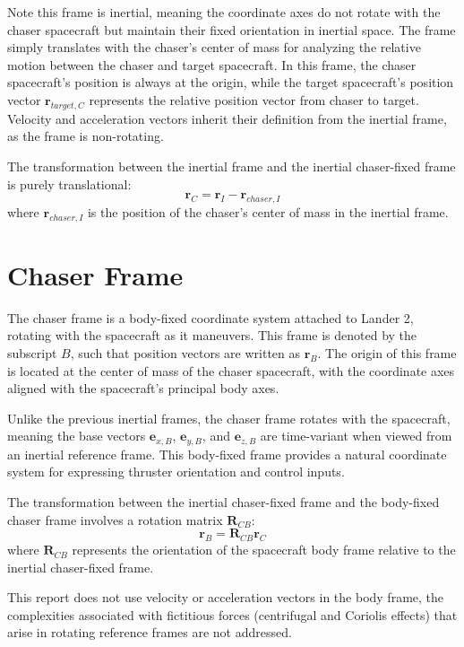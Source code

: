 Note this frame is inertial, meaning the coordinate axes do not rotate with the chaser spacecraft but maintain their fixed orientation in inertial space. The frame simply translates with the chaser's center of mass for analyzing the relative motion between the chaser and target spacecraft. In this frame, the chaser spacecraft's position is always at the origin, while the target spacecraft's position vector $\mathbf{r}_{target,C}$ represents the relative position vector from chaser to target. Velocity and acceleration vectors inherit their definition from the inertial frame, as the frame is non-rotating.

The transformation between the inertial frame and the inertial chaser-fixed frame is purely translational:
\begin{equation}
    \mathbf{r}_C = \mathbf{r}_I - \mathbf{r}_{chaser,I}
\end{equation}
where $\mathbf{r}_{chaser,I}$ is the position of the chaser's center of mass in the inertial frame.

\section{Chaser Frame}

The chaser frame is a body-fixed coordinate system attached to Lander 2, rotating with the spacecraft as it maneuvers. This frame is denoted by the subscript $B$, such that position vectors are written as $\mathbf{r}_B$. The origin of this frame is located at the center of mass of the chaser spacecraft, with the coordinate axes aligned with the spacecraft's principal body axes.

Unlike the previous inertial frames, the chaser frame rotates with the spacecraft, meaning the base vectors $\mathbf{e}_{x,B}$, $\mathbf{e}_{y,B}$, and $\mathbf{e}_{z,B}$ are time-variant when viewed from an inertial reference frame. This body-fixed frame provides a natural coordinate system for expressing thruster orientation and control inputs.

The transformation between the inertial chaser-fixed frame and the body-fixed chaser frame involves a rotation matrix $\mathbf{R}_{CB}$:
\begin{equation}
    \mathbf{r}_B = \mathbf{R}_{CB} \mathbf{r}_C
\end{equation}
where $\mathbf{R}_{CB}$ represents the orientation of the spacecraft body frame relative to the inertial chaser-fixed frame.

This report does not use velocity or acceleration vectors in the body frame, the complexities associated with fictitious forces (centrifugal and Coriolis effects) that arise in rotating reference frames are not addressed.

